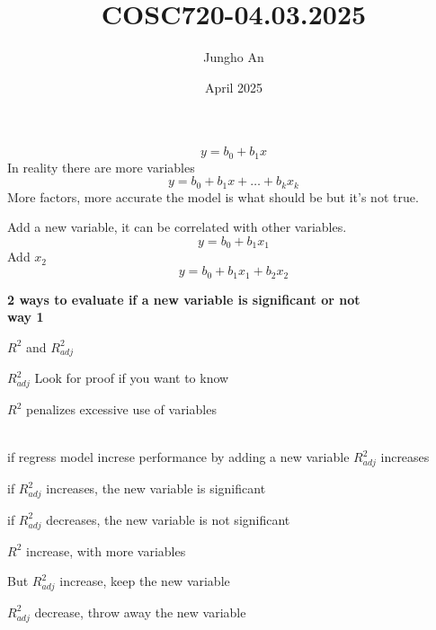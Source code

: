 \documentclass{article}
\title{COSC720-04.03.2025}
\author{Jungho An}
\date{April 2025}
\begin{document}
\maketitle
\clearpage

\[ y=b_0+b_1x \]
In reality there are more variables
\[
\displaystyle
y = b_0 + b_1x + \dots + b_kx_k
\]
More factors, more accurate the model is what should be but it's not true.

Add a new variable, it can be correlated with other variables.
\[
y = b_0 + b_1x_1
\]
Add $x_2$
\[
y = b_0 + b_1x_1 + b_2x_2
\]

\textbf{2 ways to evaluate if a new variable is significant or not}\\
\textbf{way 1}\\
\begin{list}{}{%
    \setlength{\leftmargin}{1em}
    \setlength{\topsep}{0pt}%
    \setlength{\itemsep}{0pt}%
    \setlength{\parsep}{0pt}%
    \setlength{\partopsep}{0pt}%
    \setlength{\baselineskip}{0pt}%
    \setlength{\itemindent}{0pt}%
    \setlength{\labelsep}{0pt}%
    \setlength{\labelwidth}{0pt}%
}
    \item $R^2$ and $R^2_{adj}$\\
    \item $R^2_{adj}$ Look for proof if you want to know \\
    \item $R^2$ penalizes excessive use of variables\\\
    \item if regress model increse performance by adding a new variable $R^2_{adj}$ increases\\
    \item if $R^2_{adj}$ increases, the new variable is significant\\
    \item if $R^2_{adj}$ decreases, the new variable is not significant\\
    \item $R^2$ increase, with more variables\\
    \item But $R^2_{adj}$ increase, keep the new variable\\
    \item $R^2_{adj}$ decrease, throw away the new variable\\
\end{list}
\end{document}
